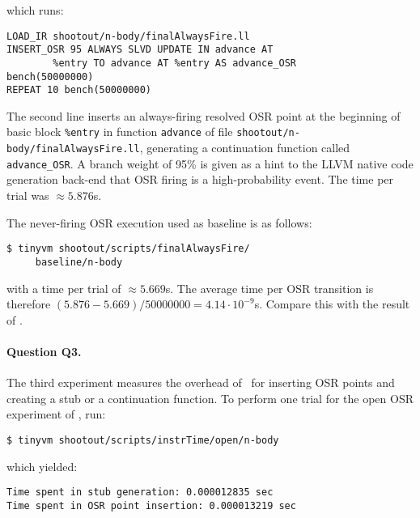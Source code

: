 \noindent which runs:

\begin{small}
\begin{verbatim}
LOAD_IR shootout/n-body/finalAlwaysFire.ll
INSERT_OSR 95 ALWAYS SLVD UPDATE IN advance AT 
        %entry TO advance AT %entry AS advance_OSR
bench(50000000)
REPEAT 10 bench(50000000)
\end{verbatim}
\end{small}

\noindent The second line inserts an always-firing resolved OSR point at the beginning of basic block {\tt \%entry} in function {\tt advance} of file {\small\tt shootout/n-body/finalAlwaysFire.ll}, generating a continuation function called {\tt advance\_OSR}. A branch weight of 95\% is given as a hint to the LLVM native code generation back-end that OSR firing is a high-probability event. The time per trial was $\approx5.876$s.

The never-firing OSR execution used as baseline is as follows:
\begin{small}
\begin{verbatim}
$ tinyvm shootout/scripts/finalAlwaysFire/
     baseline/n-body
\end{verbatim}
\end{small}

\noindent with a time per trial of $\approx5.669$s. The average time per OSR transition is therefore $(5.876-5.669)/50000000=4.14\cdot 10^{-9}$s. Compare this with the result of .

\paragraph{Question Q3.} The third experiment measures the overhead of \osrkit\ for inserting OSR points and creating a stub or a continuation function. To perform one trial for the open OSR experiment of , run:
\begin{small}
\begin{verbatim}
$ tinyvm shootout/scripts/instrTime/open/n-body
\end{verbatim}
\end{small}
\noindent which yielded:
\begin{small}
\begin{verbatim}
Time spent in stub generation: 0.000012835 sec
Time spent in OSR point insertion: 0.000013219 sec
\end{verbatim}
\end{small}

